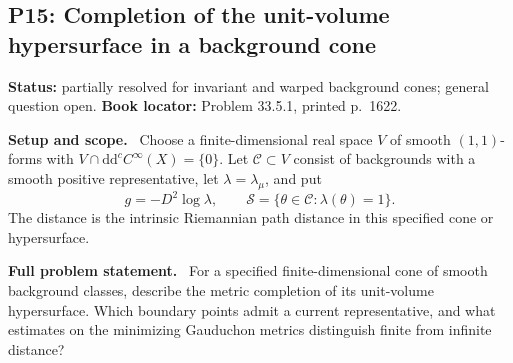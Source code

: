 \documentclass[11pt]{article}
\newcommand{\ddc}{\mathrm d\mathrm d^c}
\newcommand{\field}[1]{\par\medskip\noindent\textbf{#1.}\ }
\begin{document}
\subsection{P15: Completion of the unit-volume hypersurface in a background cone}
\label{P15}
\noindent\textbf{Status:} partially resolved for invariant and warped background cones; general question open. \textbf{Book locator:} Problem 33.5.1, printed p.~1622.
\field{Setup and scope} Choose a finite-dimensional real space $V$ of smooth $(1,1)$-forms with $V\cap\ddc C^\infty(X)=\{0\}$. Let $\mathscr C\subset V$ consist of backgrounds with a smooth positive representative, let $\lambda=\lambda_\mu$, and put
\[g=-D^2\log\lambda,\qquad \mathscr S=\{\theta\in\mathscr C:\lambda(\theta)=1\}.\]
The distance is the intrinsic Riemannian path distance in this specified cone or hypersurface.
\field{Full problem statement} For a specified finite-dimensional cone of smooth background classes, describe the metric completion of its unit-volume hypersurface. Which boundary points admit a current representative, and what estimates on the minimizing Gauduchon metrics distinguish finite from infinite distance?
\end{document}
